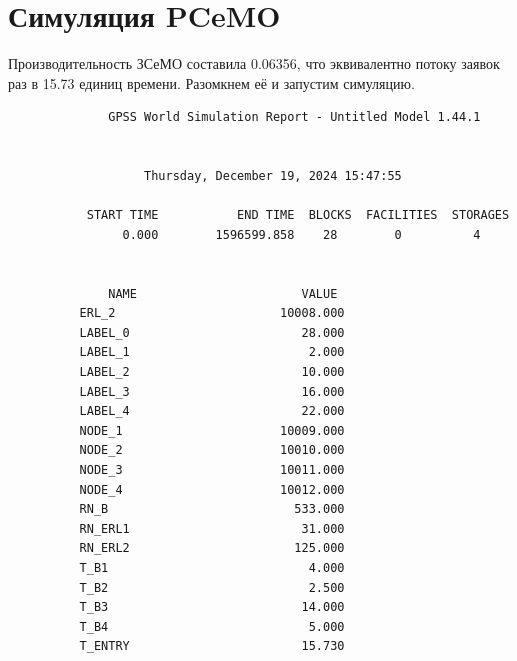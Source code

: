 \documentclass{article}
\begin{document}
\section{Симуляция PCeMO}

Производительность ЗСеМО составила 0.06356, что эквивалентно потоку заявок раз в 15.73 единиц времени. Разомкнем её и запустим симуляцию.

\begin{lstlisting}
              GPSS World Simulation Report - Untitled Model 1.44.1


                   Thursday, December 19, 2024 15:47:55

           START TIME           END TIME  BLOCKS  FACILITIES  STORAGES
                0.000        1596599.858    28        0          4


              NAME                       VALUE
          ERL_2                       10008.000
          LABEL_0                        28.000
          LABEL_1                         2.000
          LABEL_2                        10.000
          LABEL_3                        16.000
          LABEL_4                        22.000
          NODE_1                      10009.000
          NODE_2                      10010.000
          NODE_3                      10011.000
          NODE_4                      10012.000
          RN_B                          533.000
          RN_ERL1                        31.000
          RN_ERL2                       125.000
          T_B1                            4.000
          T_B2                            2.500
          T_B3                           14.000
          T_B4                            5.000
          T_ENTRY                        15.730



\end{lstlisting}
\end{document}
